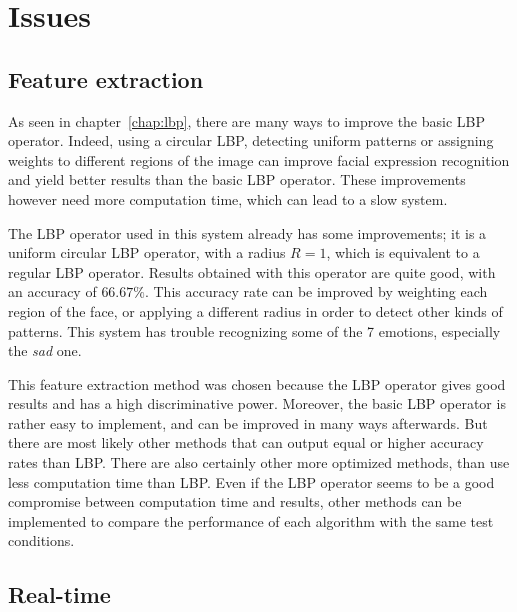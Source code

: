 \chapter{Issues}
\label{chap:eval_issues}

\section{Feature extraction}

\vspace{\baselineskip}
\noindent As seen in chapter~\ref{chap:lbp}, there are many ways to improve the basic LBP operator. Indeed, using a circular LBP, detecting uniform patterns or assigning weights to different regions of the image can improve facial expression recognition and yield better results than the basic LBP operator. These improvements however need more computation time, which can lead to a slow system.
 \newline

\noindent The LBP operator used in this system already has some improvements; it is a uniform circular LBP operator, with a radius $R = 1$, which is equivalent to a regular LBP operator. Results obtained with this operator are quite good, with an accuracy of $ 66.67\% $. This accuracy rate can be improved by weighting each region of the face, or applying a different radius in order to detect other kinds of patterns. This system has trouble recognizing some of the 7 emotions, especially the \textit{sad} one.
\newline

\noindent This feature extraction method was chosen because the LBP operator gives good results and has a high discriminative power. Moreover, the basic LBP operator is rather easy to implement, and can be improved in many ways afterwards. But there are most likely other methods that can output equal or higher accuracy rates than LBP.  There are also certainly other more optimized methods, than use less computation time than LBP. Even if the LBP operator seems to be a good compromise between computation time and results, other methods can be implemented to compare the performance of each algorithm with the same test conditions.
\newline

\section{Real-time}


